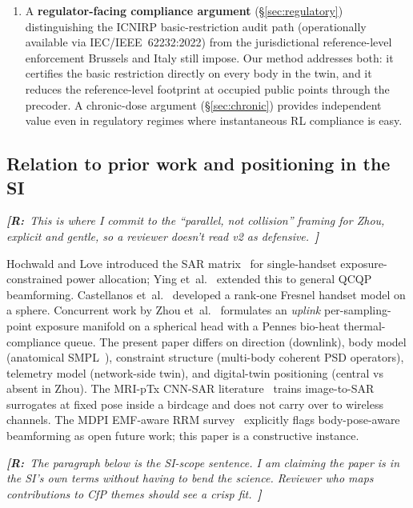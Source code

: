 \documentclass[journal,twocolumn,10pt]{IEEEtran}
\theoremstyle{definition}
\newcommand{\robinnote}[1]{%
  {\color{red!75!black}\textit{\textbf{[R:}~#1~\textbf{]}}}}
\begin{document}
\begin{enumerate}
\item
A \textbf{regulator-facing compliance argument}
(\S\ref{sec:regulatory}) distinguishing the ICNIRP basic-restriction
audit path (operationally available via IEC/IEEE~62232:2022) from
the jurisdictional reference-level enforcement Brussels and
Italy still impose. Our method addresses both: it certifies
the basic restriction directly on every body in the twin, and it
reduces the reference-level footprint at occupied public points
through the precoder. A chronic-dose argument
(\S\ref{sec:chronic}) provides independent value even in
regulatory regimes where instantaneous RL compliance is easy.

\end{enumerate}

\subsection{Relation to prior work and positioning in the SI}

\robinnote{This is where I commit to the ``parallel, not collision''
framing for Zhou, explicit and gentle, so a reviewer doesn't read
v2 as defensive.}

Hochwald and Love introduced the SAR
matrix~\cite{Hochwald2014,Hochwald2019} for single-handset
exposure-constrained power allocation; Ying
et~al.~\cite{Ying2015,Ying2017} extended this to general QCQP
beamforming. Castellanos et~al.~\cite{Castellanos2020} developed
a rank-one Fresnel handset model on a sphere. Concurrent work
by Zhou et~al.~\cite{Zhou2026} formulates an \emph{uplink}
per-sampling-point exposure manifold on a spherical head with a
Pennes bio-heat \cite{Pennes1948} thermal-compliance queue. The
present paper differs on direction (downlink), body model
(anatomical SMPL~\cite{SMPL}), constraint structure (multi-body
coherent PSD operators), telemetry model (network-side twin), and
digital-twin positioning (central vs absent in Zhou). The
MRI-pTx CNN-SAR literature~\cite{Meliado2020,Gokyar2023} trains
image-to-SAR surrogates at fixed pose inside a birdcage and does
not carry over to wireless channels. The MDPI EMF-aware RRM
survey~\cite{Survey2025} explicitly flags body-pose-aware
beamforming as open future work; this paper is a constructive
instance.

\robinnote{The paragraph below is the SI-scope sentence. I am
claiming the paper is in the SI's own terms without having to
bend the science. Reviewer who maps contributions to CfP
themes should see a crisp fit.}
\end{document}
